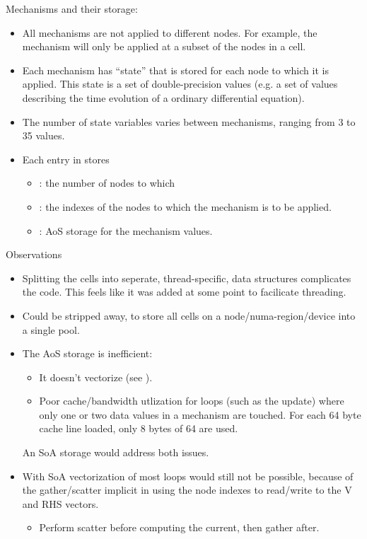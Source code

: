 \noindent
Mechanisms and their storage:
\begin{itemize}
\item
    All mechanisms are not applied to different nodes. For example, the  mechanism will only be applied at a subset of the nodes in a cell.
\item
    Each mechanism has ``state'' that is stored for each node to which it is applied. This state is a set of double-precision values (e.g. a set of values describing the time evolution of a ordinary differential equation).
\item
    The number of state variables varies between mechanisms, ranging from 3 to 35 values.
\item
    Each entry in  stores 
    \begin{itemize}
    \item
        : the number of nodes to which
    \item
        : the indexes of the nodes to which the mechanism is to be applied.
    \item
        : AoS storage for the mechanism  values.
    \end{itemize}
\end{itemize}



\noindent
Observations
\begin{itemize}
\item
    Splitting the cells into seperate, thread-specific, data structures complicates the code. This feels like it was added at some point to facilicate threading.
\item
    Could be stripped away, to store all cells on a node/numa-region/device into a single pool.
\item
    The AoS storage is inefficient:
    \begin{itemize}
    \item
        It doesn't vectorize (see ).
    \item
        Poor cache/bandwidth utlization for loops (such as the  update) where only one or two data values in a mechanism are touched. For each 64 byte cache line loaded, only 8 bytes of 64 are used.
    \end{itemize}
    An SoA storage would address both issues.
\item
    With SoA vectorization of most loops would still not be possible, because of the gather/scatter implicit in using the node indexes to read/write to the V and RHS vectors.
    \begin{itemize}
    \item
        Perform scatter before computing the current, then gather after.
    \end{itemize}
\end{itemize}


